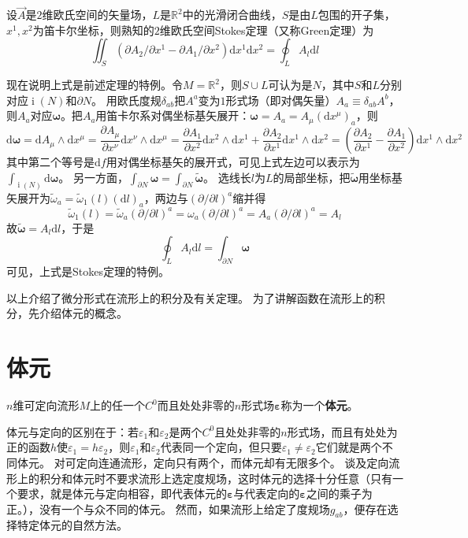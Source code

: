 \begin{example}
    设$\vec{A}$是$2$维欧氏空间的矢量场，$L$是$\mathbb{R}^2$中的光滑闭合曲线，$S$是由$L$包围的开子集，$x^1, x^2$为笛卡尔坐标，则熟知的$2$维欧氏空间Stokes定理（又称Green定理）为
    $$\iint_S(\partial A_2 / \partial x^1 - \partial A_1 / \partial x^2)\mathrm{d}x^1\mathrm{d}x^2 = \oint_LA_l\mathrm{d}l$$

    现在说明上式是前述定理的特例。令$M = \mathbb{R}^2$，则$S \cup L$可认为是$N$，其中$S$和$L$分别对应$\operatorname{i}(N)$和$\partial N$。
    用欧氏度规$\delta_{ab}$把$A^a$变为$1$形式场（即对偶矢量）$A_a \equiv \delta_{ab}A^b$，则$A_a$对应$\bm\omega$。把$A_a$用笛卡尔系对偶坐标基矢展开：$\bm\omega = A_a = A_\mu(\mathrm{d}x^\mu)_a$，则
    $$\mathrm{d}\bm\omega = \mathrm{d}A_\mu \wedge \mathrm{d}x^\mu = \frac{\partial A_\mu}{\partial x^\nu}\mathrm{d}x^\nu \wedge \mathrm{d}x^\mu = \frac{\partial A_1}{\partial x^2}\mathrm{d}x^2 \wedge \mathrm{d}x^1 + \frac{\partial A_2}{\partial x^1}\mathrm{d}x^1 \wedge \mathrm{d}x^2 = (\frac{\partial A_2}{\partial x^1} - \frac{\partial A_1}{\partial x^2})\mathrm{d}x^1 \wedge \mathrm{d}x^2$$
    其中第二个等号是$\mathrm{d}f$用对偶坐标基矢的展开式，可见上式左边可以表示为$\displaystyle\int_{\operatorname{i}(N)}\mathrm{d}\bm\omega$。
    另一方面，$\displaystyle\int_{\partial N}\bm\omega = \int_{\partial N}\bm{\tilde\omega}$。
    选线长$l$为$L$的局部坐标，把$\bm{\tilde\omega}$用坐标基矢展开为$\tilde\omega_a = \tilde\omega_1(l)(\mathrm{d}l)_a$，两边与$(\partial / \partial l)^a$缩并得
    $$\tilde\omega_1(l) = \tilde\omega_a(\partial / \partial l)^a = \omega_a(\partial / \partial l)^a = A_a(\partial / \partial l)^a = A_l$$
    故$\bm{\tilde\omega} = A_l\mathrm{d}l$，于是
    $$\oint_L A_l\mathrm{d}l = \int_{\partial N}\bm\omega$$
    可见，上式是Stokes定理的特例。
\end{example}

以上介绍了微分形式在流形上的积分及有关定理。
为了讲解函数在流形上的积分，先介绍体元的概念。

\section{体元}

\begin{definition}
    $n$维可定向流形$M$上的任一个$C^0$而且处处非零的$n$形式场$\bm\varepsilon$称为一个\textbf{体元}。
\end{definition}

\begin{note}
    体元与定向的区别在于：若$\varepsilon_1$和$\varepsilon_2$是两个$C^0$且处处非零的$n$形式场，而且有处处为正的函数$h$使$\varepsilon_1 = h \varepsilon_2$，则$\varepsilon_1$和$\varepsilon_2$代表同一个定向，但只要$\varepsilon_1 \neq \varepsilon_2$它们就是两个不同体元。
    对可定向连通流形，定向只有两个，而体元却有无限多个。
    谈及定向流形上的积分和体元时不要求流形上选定度规场，这时体元的选择十分任意（只有一个要求，就是体元与定向相容，即代表体元的$\bm\varepsilon$与代表定向的$\bm\varepsilon$之间的乘子为正。），没有一个与众不同的体元。
    然而，如果流形上给定了度规场$g_{ab}$，便存在选择特定体元的自然方法。
\end{note}


